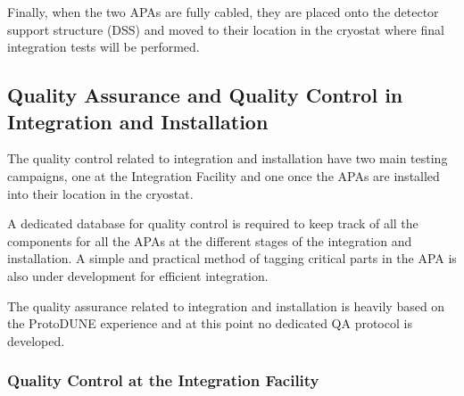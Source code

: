 

Finally, when the two APAs are fully cabled, they are placed onto the detector support structure (DSS) and moved to their location in the cryostat where final integration tests will be performed.



\subsection{Quality Assurance and Quality Control in Integration and Installation}
\label{sec:fdsp-apa-install-calib}

The quality control related to integration and installation have two main testing campaigns, one at the Integration Facility and one once the APAs are installed into their location in the cryostat.

A dedicated database for quality control is required to keep track of all the components for all the APAs at the different stages of the integration and installation. A simple and practical method of tagging critical parts in the APA is also under development for efficient integration.

The quality assurance related to integration and installation is heavily based on the ProtoDUNE experience and at this point no dedicated QA protocol is developed.

\subsubsection{Quality Control at the Integration Facility}
\label{sec:fdsp-apa-install-qc_if}

